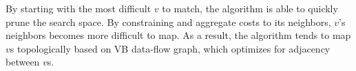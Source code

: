 By starting with the most difficult $v$ to match, the algorithm is able to quickly prune the search space.
By constraining and aggregate costs to its neighbors, $v$'s neighbors becomes more difficult to map. As a
result, the algorithm tends to map $v$s topologically based on VB data-flow graph, which optimizes
for adjacency between $v$s. 
\fi


